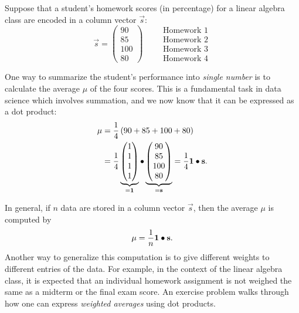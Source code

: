 \documentclass{ximera}
\begin{document}
\begin{example}
  Suppose that a student's homework scores (in percentage) for a
  linear algebra class are encoded in a column vector $\vec{s}$:
  \[
    \vec{s} =
    \begin{pmatrix}
      90 \\ 85 \\ 100 \\ 80
    \end{pmatrix}
    \qquad
    \begin{array}{l}
      \text{Homework 1}\\
      \text{Homework 2}\\
      \text{Homework 3}\\
      \text{Homework 4}
    \end{array}
  \]
  \begin{explanation}
    One way to summarize the student's performance into \textit{single
      number} is to calculate the average $\mu$ of the four scores. This
    is a fundamental task in data science which involves summation,
    and we now know that it can be expressed as a dot product:
    \begin{align*}
      \mu
      & = \frac{1}{4} \left( 90 + 85 + 100 + 80 \right) \\
      & = \frac{1}{4}
        \underbrace{
        \begin{pmatrix}
          1 \\ 1 \\ 1 \\ 1
        \end{pmatrix}}_{=\mathbf{1}}
        \bullet
        \underbrace{
        \begin{pmatrix}
          90 \\ 85 \\ 100 \\ 80
        \end{pmatrix}}_{=\mathbf{s}} = \frac{1}{4} \mathbf{1} \bullet \mathbf{s}.
    \end{align*}
  \end{explanation}

  In general, if $n$ data are stored in a column vector $\vec{s}$, then
  the average $\mu$ is computed by
  \[
    \mu = \frac{1}{n} \mathbf{1} \bullet \mathbf{s}.
  \]
  Another way to generalize this computation is to give different
  weights to different entries of the data. For example, in the
  context of the linear algebra class, it is expected that an
  individual homework assignment is not weighed the same as a midterm
  or the final exam score. An exercise problem walks through how one
  can express \textit{weighted averages} using dot products.
\end{example}
\end{document}

